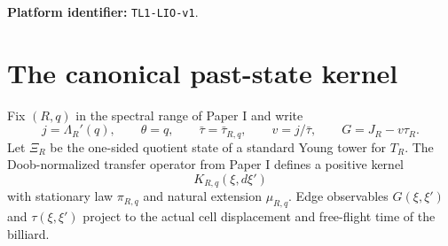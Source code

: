 
\begin{abstract}
We derive a nonlinear physical-time generator from the compact periodic Sinai
billiard and Liouville current preparation of Papers I--II.  The canonical
field $\theta$ is fixed by the prepared cell current through
$\theta=I_R'(j)$.  It is not introduced as a free risk parameter.  The exact
microscopic nonlinear recursion is the conditional excess pressure of the
Doob-normalized Lorentz transfer operator on the one-sided tower quotient.
The associated kernel is a disintegration of a deterministic two-sided
billiard path measure, not a stochastic collision law.

A spectral Poisson corrector and a quadratic multiplicative cell problem yield
collision-clock consistency.  The correct physical observable is the
clock-centred cell increment $G=J-v\tau$.  Its pressure-root variance produces
both the linear diffusion term and the quadratic entropic term.  Exponential
random-horizon control converts the collision recursion to actual physical
time.  The limiting generator is
\[
 \mathfrak G_{R,j}f
 =c+bf'+\frac{D_{R,j}}2f''
 +\frac{\theta_R(j)D_{R,j}}2(f')^2.
\]
We distinguish exact canonical dynamic programming from finite
microcanonical conditioning: the latter justifies the canonical preparation
through an iterated or diagonal preparation limit and is never declared
Markov at finite size.
\end{abstract}
\maketitle
\noindent\textbf{Platform identifier:} \texttt{TL1-LIO-v1}.

\tableofcontents

\section{The canonical past-state kernel}\label{sec:kernel}
Fix $(R,q)$ in the spectral range of Paper I and write
\[
 j=\Lambda_R'(q),\qquad \theta=q,
 \qquad \bar\tau=\bar\tau_{R,q},
 \qquad v=j/\bar\tau,
 \qquad G=J_R-v\tau_R.
\]
Let $\Xi_R$ be the one-sided quotient state of a standard Young tower for
$T_R$.  The Doob-normalized transfer operator from Paper I defines a positive
kernel
\[
 K_{R,q}(\xi,d\xi')
\]
with stationary law $\pi_{R,q}$ and natural extension $\mu_{R,q}$.
Edge observables $G(\xi,\xi')$ and $\tau(\xi,\xi')$ project to the actual
cell displacement and free-flight time of the billiard.

